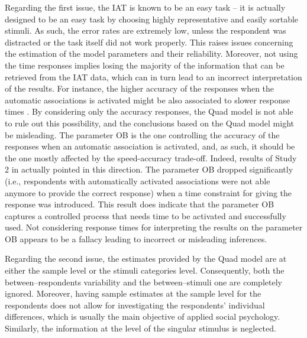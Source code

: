 \documentclass[12pt]{book}
\begin{document}
Regarding the first issue, the IAT is known to be an easy task -- it is actually designed to be an easy task by choosing highly representative and easily sortable stimuli. As such, the error rates are extremely low, unless the respondent was distracted or the task itself did not work properly. This raises issues concerning the estimation of the model parameters and their reliability. Moreover, not using the time responses implies losing the majority of the information that can be retrieved from the IAT data, which can in turn lead to an incorrect interpretation of the results. 
For instance, the higher accuracy of the responses when the automatic associations is activated might be also associated to slower response times \cite<speed-accuracy trade-off,>{Klauer2007}. By considering only the accuracy responses, the Quad model is not able to rule out this possibility, and the conclusions based on the Quad model might be misleading.
The parameter OB is the one controlling the accuracy of the responses when an automatic association is activated, and, as such, it should be the one mostly affected by the speed-accuracy trade-off. Indeed, results of Study 2 in  actually pointed in this direction. The parameter OB dropped significantly (i.e., respondents with automatically activated associations were not able anymore to provide the correct response) when a time constraint for giving the response was introduced.
This result does indicate that the parameter OB captures a controlled process that needs time to be activated and successfully used. 
Not considering response times for interpreting the results on the parameter OB appears to be a fallacy leading to incorrect or misleading inferences.

Regarding the second issue, the estimates provided by the Quad model are at either the sample level or the stimuli categories level. 
Consequently, both the between--respondents variability and the between--stimuli one are completely ignored. 
Moreover, having sample estimates at the sample level for the respondents does not allow for investigating the respondents' individual differences, which is usually the main objective of applied social psychology. 
Similarly, the information at the level of the singular stimulus is neglected. 
\end{document}
